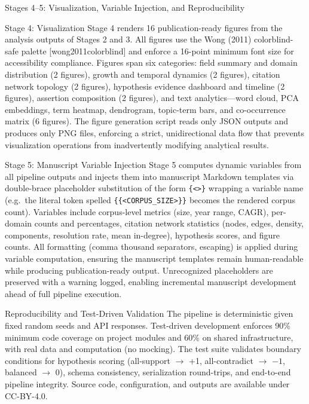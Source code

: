 \documentclass[
  ignorenonframetext,
]{beamer}
\author{\texorpdfstring{}{}}
\date{}
\providecommand{\citep}[1]{[#1]}
\begin{document}
\begin{frame}{Stages 4--5: Visualization,
Variable Injection, and Reproducibility \label{sec:methods_viz}}
\protect{}\label{stages-45-visualization-variable-injection-and-reproducibility}
\begin{block}{Stage 4: Visualization}
\protect{}\label{stage-4-visualization}
Stage 4 renders 16 publication-ready figures from the analysis outputs
of Stages 2 and 3. All figures use the Wong (2011) colorblind-safe
palette \citep{wong2011colorblind} and enforce a 16-point minimum font
size for accessibility compliance. Figures span six categories: field
summary and domain distribution (2 figures), growth and temporal
dynamics (2 figures), citation network topology (2 figures), hypothesis
evidence dashboard and timeline (2 figures), assertion composition (2
figures), and text analytics---word cloud, PCA embeddings, term heatmap,
dendrogram, topic-term bars, and co-occurrence matrix (6 figures). The
figure generation script reads only JSON outputs and produces only PNG
files, enforcing a strict, unidirectional data flow that prevents
visualization operations from inadvertently modifying analytical
results.
\end{block}

\begin{block}{Stage 5: Manuscript Variable Injection}
\protect{}\label{stage-5-manuscript-variable-injection}
Stage 5 computes dynamic variables from all pipeline outputs and injects
them into manuscript Markdown templates via double-brace placeholder
substitution of the form \texttt{\{\textless{}\textgreater{}\}} wrapping
a variable name (e.g.~the literal token spelled
\texttt{\{\{\textless{}CORPUS\_SIZE\textgreater{}\}\}} becomes the
rendered corpus count). Variables include corpus-level metrics (size,
year range, CAGR), per-domain counts and percentages, citation network
statistics (nodes, edges, density, components, resolution rate, mean
in-degree), hypothesis scores, and figure counts. All formatting (comma
thousand separators, escaping) is applied during variable computation,
ensuring the manuscript templates remain human-readable while producing
publication-ready output. Unrecognized placeholders are preserved with a
warning logged, enabling incremental manuscript development ahead of
full pipeline execution.
\end{block}

\begin{block}{Reproducibility and Test-Driven Validation}
\protect{}\label{reproducibility-and-test-driven-validation}
The pipeline is deterministic given fixed random seeds and API
responses. Test-driven development enforces 90\% minimum code coverage
on project modules and 60\% on shared infrastructure, with real data and
computation (no mocking). The test suite validates boundary conditions
for hypothesis scoring (all-support \(\to\) +1, all-contradict \(\to\)
\(-1\), balanced \(\to\) 0), schema consistency, serialization
round-trips, and end-to-end pipeline integrity. Source code,
configuration, and outputs are available under CC-BY-4.0.
\end{block}
\end{frame}
\end{document}
